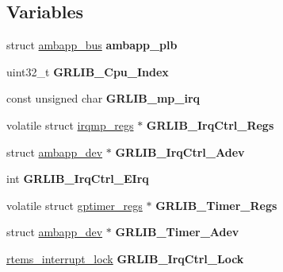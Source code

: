 \subsection*{Variables}
\begin{DoxyCompactItemize}
\item 
\mbox{\label{group__RTEMSBSPsRISCVGRLIBAMBA_gaebe1fa29572f97b26c2982eb6b094801}} 
struct \mbox{\hyperlink{structambapp__bus}{ambapp\+\_\+bus}} {\bfseries ambapp\+\_\+plb}
\item 
\mbox{\label{group__RTEMSBSPsRISCVGRLIBAMBA_ga01491814076cfdf1fad2e7911f1bf1a3}} 
uint32\+\_\+t {\bfseries G\+R\+L\+I\+B\+\_\+\+Cpu\+\_\+\+Index}
\item 
\mbox{\label{group__RTEMSBSPsRISCVGRLIBAMBA_ga5b71e264584fadf74da8fb588238e297}} 
const unsigned char {\bfseries G\+R\+L\+I\+B\+\_\+mp\+\_\+irq}
\item 
\mbox{\label{group__RTEMSBSPsRISCVGRLIBAMBA_ga1e1874d8b9cf8c1ccbd5a8a615249f9b}} 
volatile struct \mbox{\hyperlink{structirqmp__regs}{irqmp\+\_\+regs}} $\ast$ {\bfseries G\+R\+L\+I\+B\+\_\+\+Irq\+Ctrl\+\_\+\+Regs}
\item 
\mbox{\label{group__RTEMSBSPsRISCVGRLIBAMBA_ga5a319ca3adff7780792337f7d704c9eb}} 
struct \mbox{\hyperlink{structambapp__dev}{ambapp\+\_\+dev}} $\ast$ {\bfseries G\+R\+L\+I\+B\+\_\+\+Irq\+Ctrl\+\_\+\+Adev}
\item 
\mbox{\label{group__RTEMSBSPsRISCVGRLIBAMBA_ga34822c179de046c4661d935cdfac4703}} 
int {\bfseries G\+R\+L\+I\+B\+\_\+\+Irq\+Ctrl\+\_\+\+E\+Irq}
\item 
\mbox{\label{group__RTEMSBSPsRISCVGRLIBAMBA_ga439e33af1c42b7bbedccba69584838db}} 
volatile struct \mbox{\hyperlink{structgptimer__regs}{gptimer\+\_\+regs}} $\ast$ {\bfseries G\+R\+L\+I\+B\+\_\+\+Timer\+\_\+\+Regs}
\item 
\mbox{\label{group__RTEMSBSPsRISCVGRLIBAMBA_ga1fe394559480a7e195e9538db2ced2f4}} 
struct \mbox{\hyperlink{structambapp__dev}{ambapp\+\_\+dev}} $\ast$ {\bfseries G\+R\+L\+I\+B\+\_\+\+Timer\+\_\+\+Adev}
\item 
\mbox{\label{group__RTEMSBSPsRISCVGRLIBAMBA_ga90ccaec9780d4fb2dc0b545f171d43d2}} 
\mbox{\hyperlink{group__ClassicINTRLocks_ga7d4b54b01fd1507aa842d5fbc7b11177}{rtems\+\_\+interrupt\+\_\+lock}} {\bfseries G\+R\+L\+I\+B\+\_\+\+Irq\+Ctrl\+\_\+\+Lock}
\end{DoxyCompactItemize}


